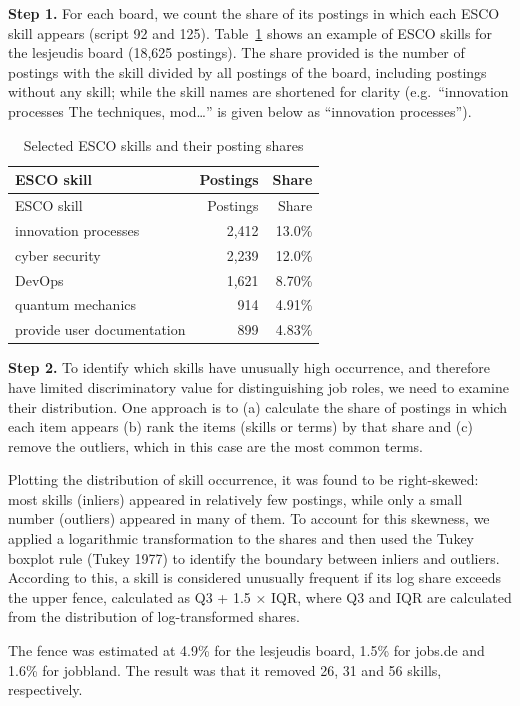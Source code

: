 \documentclass[
  letterpaper,
  DIV=11,
  numbers=noendperiod,
  sfdefaults=false]{scrartcl}
\begin{document}
\textbf{Step 1.} For each board, we count the share of its postings in
which each ESCO skill appears (script 92 and 125).
Table~\ref{tbl-esco-skills} shows an example of ESCO skills for the
lesjeudis board (18,625 postings). The share provided is the number of
postings with the skill divided by all postings of the board, including
postings without any skill; while the skill names are shortened for
clarity (e.g.~``innovation processes The techniques, mod\ldots{}'' is
given below as ``innovation processes'').

\begin{longtable}[]{@{}lrr@{}}
\caption{Selected ESCO skills and their posting
shares}\label{tbl-esco-skills}\tabularnewline
\toprule\noalign{}
ESCO skill & Postings & Share \\
\midrule\noalign{}
\endfirsthead
\toprule\noalign{}
ESCO skill & Postings & Share \\
\midrule\noalign{}
\endhead
\bottomrule\noalign{}
\endlastfoot
innovation processes & 2,412 & 13.0\% \\
cyber security & 2,239 & 12.0\% \\
DevOps & 1,621 & 8.70\% \\
quantum mechanics & 914 & 4.91\% \\
provide user documentation & 899 & 4.83\% \\
\end{longtable}

\textbf{Step 2.} To identify which skills have unusually high
occurrence, and therefore have limited discriminatory value for
distinguishing job roles, we need to examine their distribution. One
approach is to (a) calculate the share of postings in which each item
appears (b) rank the items (skills or terms) by that share and (c)
remove the outliers, which in this case are the most common terms.

Plotting the distribution of skill occurrence, it was found to be
right-skewed: most skills (inliers) appeared in relatively few postings,
while only a small number (outliers) appeared in many of them. To
account for this skewness, we applied a logarithmic transformation to
the shares and then used the Tukey boxplot rule (Tukey 1977) to identify
the boundary between inliers and outliers. According to this, a skill is
considered unusually frequent if its log share exceeds the upper fence,
calculated as Q3 + 1.5 × IQR, where Q3 and IQR are calculated from the
distribution of log-transformed shares.

The fence was estimated at 4.9\% for the lesjeudis board, 1.5\% for
jobs.de and 1.6\% for jobbland. The result was that it removed 26, 31
and 56 skills, respectively.
\end{document}
